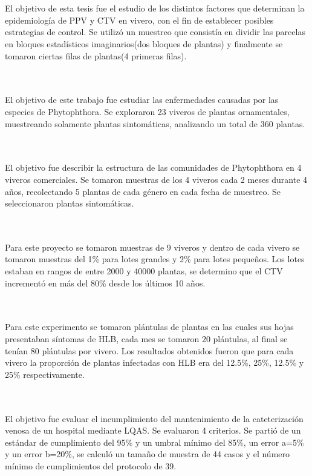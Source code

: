 ~\\\textbf{\citet{AC1}}
~\\El objetivo de esta tesis fue el estudio de los distintos factores que determinan la epidemiolog\'{i}a de PPV y CTV en vivero, con el fin de establecer posibles estrategias de control. Se utiliz\'{o} un muestreo que consist\'{i}a en dividir las parcelas en bloques estad\'{i}sticos imaginarios(dos bloques de plantas) y finalmente se tomaron ciertas filas de plantas(4 primeras filas).

~\\\textbf{\citet{AC2}}
~\\El objetivo de este trabajo fue estudiar las enfermedades causadas por las especies de Phytophthora. Se exploraron 23 viveros de plantas ornamentales, muestreando solamente plantas sintom\'{a}ticas, analizando un total de 360 plantas.

~\\\textbf{\citet{AC3}}
~\\El objetivo fue describir la estructura de las comunidades de Phytophthora en 4 viveros comerciales. Se tomaron muestras de los 4 viveros cada 2 meses durante 4 a\~{n}os, recolectando 5 plantas de cada género en cada fecha de muestreo. Se seleccionaron plantas sintom\'{a}ticas.

~\\\textbf{\citet{AC4}}
~\\Para este proyecto se tomaron muestras de 9 viveros y dentro de cada vivero se tomaron muestras del 1\% para lotes grandes y 2\% para lotes peque\~{n}os. Los lotes estaban en rangos de entre 2000 y 40000 plantas, se determino que el CTV increment\'{o} en m\'{a}s del 80\% desde los \'{u}ltimos 10 a\~{n}os.

~\\\textbf{\citet{AC5}}
~\\Para este experimento se tomaron pl\'{a}ntulas de plantas en las cuales sus hojas presentaban s\'{i}ntomas de HLB, cada mes se tomaron 20 pl\'{a}ntulas, al final se ten\'{i}an 80 pl\'{a}ntulas por vivero. Los resultados obtenidos fueron que para cada vivero la proporci\'{o}n de plantas infectadas con HLB era del 12.5\%, 25\%, 12.5\% y 25\% respectivamente.

~\\\textbf{\citet{AE1}}
~\\El objetivo fue evaluar el incumplimiento del mantenimiento de la cateterizaci\'{o}n venosa de un hospital mediante LQAS. Se evaluaron 4 criterios. Se parti\'{o} de un est\'{a}ndar de cumplimiento del 95\% y un umbral m\'{i}nimo del 85\%, un error a=5\% y un error b=20\%, se calcul\'{o} un tama\~{n}o de muestra de 44 casos y el n\'{u}mero m\'{i}nimo de cumplimientos del protocolo de 39.

